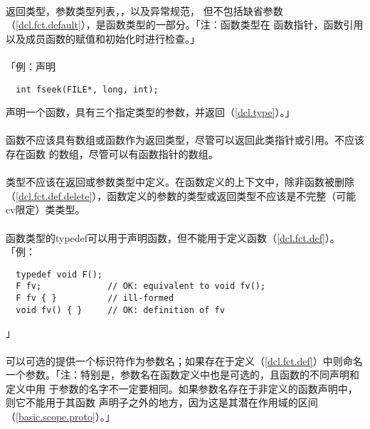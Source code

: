 \paragraph{}
返回类型，参数类型列表，，以及异常规范，
但不包括缺省参数（\ref{dcl.fct.default}），是函数类型的一部分。「注：函数类型在
函数指针，函数引用以及成员函数的赋值和初始化时进行检查。」

\paragraph{}
「例：声明
\begin{lstlisting}
  int fseek(FILE*, long, int);
\end{lstlisting}
声明一个函数，具有三个指定类型的参数，并返回（\ref{dcl.type}）。」

\paragraph{}
函数不应该具有数组或函数作为返回类型，尽管可以返回此类指针或引用。不应该存在函数
的数组，尽管可以有函数指针的数组。

\paragraph{}
类型不应该在返回或参数类型中定义。在函数定义的上下文中，除非函数被删除
（\ref{dcl.fct.def.delete}），函数定义的参数的类型或返回类型不应该是不完整（可能
cv限定）类类型。

\paragraph{}
函数类型的typedef可以用于声明函数，但不能用于定义函数（\ref{dcl.fct.def}）。
「例：
\begin{lstlisting}
  typedef void F();
  F fv;             // OK: equivalent to void fv();
  F fv { }          // ill-formed
  void fv() { }     // OK: definition of fv
\end{lstlisting}」

\paragraph{}
可以可选的提供一个标识符作为参数名；如果存在于定义（\ref{dcl.fct.def}）中则命名
一个参数。「注：特别是，参数名在函数定义中也是可选的，且函数的不同声明和定义中用
于参数的名字不一定要相同。如果参数名存在于非定义的函数声明中，则它不能用于其函数
声明子之外的地方，因为这是其潜在作用域的区间（\ref{basic.scope.proto}）。」

